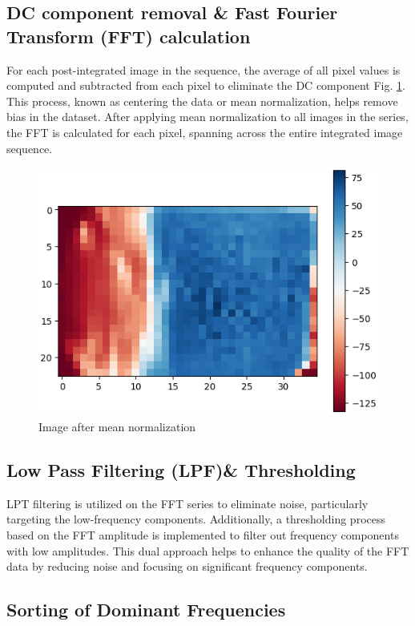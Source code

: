 \documentclass[conference]{IEEEtran}
\begin{document}
\subsection{DC component removal \& Fast Fourier Transform (FFT) calculation}


For each post-integrated image in the sequence, the average of all pixel values is computed and subtracted from each pixel to eliminate the DC component Fig. \ref{fig:k4}. This process, known as centering the data or mean normalization, helps remove bias in the dataset. After applying mean normalization to all images in the series, the FFT is calculated for each pixel, spanning across the entire integrated image sequence.

		\begin{figure}[H]
	\includegraphics[scale=.51]{plot/pool2.png}
	\caption{Image after mean normalization}\label{fig:k4}
\end{figure}

\subsection{Low Pass Filtering (LPF)\& Thresholding}

LPT filtering is utilized on the FFT series to eliminate noise, particularly targeting the low-frequency components. Additionally, a thresholding process based on the FFT amplitude is implemented to filter out frequency components with low amplitudes. This dual approach helps to enhance the quality of the FFT data by reducing noise and focusing on significant frequency components.

\subsection{Sorting of Dominant Frequencies}
\end{document}
